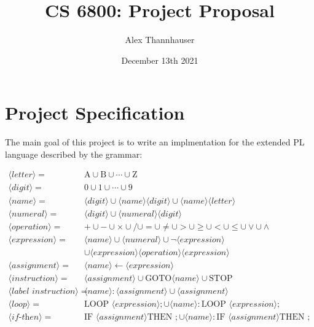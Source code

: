 \documentclass[letterpaper,11pt]{article}
\begin{document}
{
	\title{CS 6800: Project Proposal}
	\author{Alex Thannhauser}
	\date{December 13th 2021}
	
	\maketitle
	
	\section{Project Specification}
	{
		The main goal of this project is to write an implmentation for the
		extended PL language described by the grammar:
		
		\begin{align*}
			\langle letter \rangle =& \text{A} \cup \text{B} \cup \cdots \cup \text{Z}\\
			\langle digit \rangle =& \text{0} \cup \text{1} \cup \cdots \cup \text{9}\\
			\langle name \rangle =& \langle digit \rangle
				\cup \langle name \rangle \langle digit \rangle
				\cup \langle name \rangle \langle letter \rangle\\
			\langle numeral \rangle =& \langle digit \rangle
				\cup \langle numeral \rangle \langle digit \rangle\\
			\langle operation \rangle =& + \cup - \cup \times \cup / \cup =
				\cup \neq \cup > \cup \geq \cup < \cup \leq \cup \lor \cup \land\\
			\langle expression \rangle =& \langle name \rangle
				\cup \langle numeral \rangle
				\cup \lnot \langle expression \rangle\\
				& \cup \langle expression \rangle \langle operation \rangle \langle expression \rangle\\
			\langle assignment \rangle =& \langle name \rangle \leftarrow \langle expression \rangle\\
			\langle instruction \rangle =& \langle assignment \rangle
				\cup \text{GOTO} \langle name \rangle
				\cup \text{STOP}\\
			\langle \textit{label instruction} \rangle =& \langle name \rangle: \langle assignment \rangle
				\cup \langle assignment \rangle\\
			\langle \textit{loop} \rangle =& \text{LOOP } \langle expression \rangle;
				\cup \langle name \rangle: \text{LOOP } \langle expression \rangle;\\
			\langle \textit{if-then} \rangle =& \text{IF } \langle assignment \rangle \text{THEN };
				\cup \langle name \rangle: \text{IF } \langle assignment \rangle \text{THEN };\\

\end{align*}}}
\end{document}
